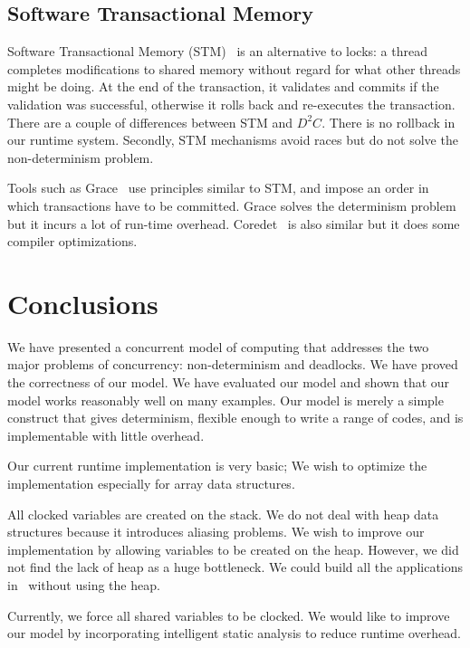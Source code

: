 \documentclass[10pt, conference, compsocconf]{IEEEtran}
\begin{document}
\subsection{Software Transactional Memory} 
Software Transactional Memory (STM)~\cite{shavit1995software} 
  is an alternative to locks: a thread completes modifications to  
shared memory without regard for what other threads might be doing. At the end of the transaction, 
it validates and commits if the validation was successful, otherwise it rolls back and re-executes 
the transaction. There are a couple of differences between STM and $D^2C$.
There is no rollback in our runtime system. Secondly,
 STM mechanisms avoid races but do not solve the non-determinism problem. 
 
Tools such as Grace~\cite{berger2009grace} use principles similar to STM, and impose 
an order in which transactions have to be committed. Grace solves the determinism problem 
but it incurs a lot of run-time overhead. Coredet~\cite{bergan2010coredet} is also similar but it does some compiler optimizations. 




\section{Conclusions}
\label{sec:conclusions}
We have presented a concurrent model of computing that addresses the
two major problems of concurrency: non-determinism and deadlocks.
We have proved the correctness of our model. We have evaluated
our model and shown that our model works reasonably well on many
examples.
Our model is merely a simple construct that gives determinism,
flexible enough to write a range of codes, and is implementable with little overhead.

Our current runtime implementation is very basic; 
We wish to optimize
the implementation especially for array data structures.

All clocked variables are created on the stack.
We do not deal with heap data structures because
it introduces aliasing problems.
We wish to improve
our implementation by allowing variables to be created on the heap.
However, we did not find the lack of heap as a huge bottleneck.
We could build all the applications in~ without
using the heap.

Currently, we force all shared variables to be clocked. We would
like to improve our model by incorporating intelligent
static analysis to reduce runtime overhead.
\end{document}
